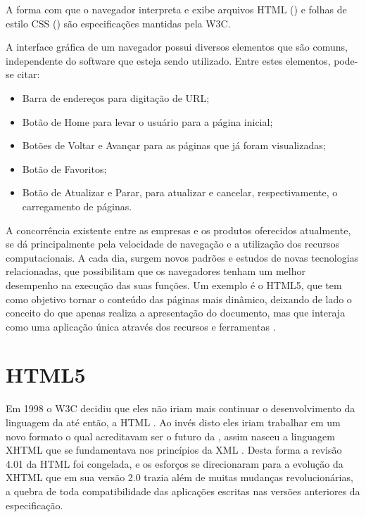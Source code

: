 \documentclass[espaco=simples,appendix=Name]{abnt}
\begin{document}
A forma com que o navegador interpreta e exibe arquivos HTML () e folhas de estilo CSS () são especificações mantidas pela W3C.

A interface gráfica de um navegador possui diversos elementos que são comuns, independente do software que esteja sendo utilizado. Entre estes elementos, pode-se citar: 
\begin{itemize}
	\item Barra de endereços para digitação de URL;
	\item Botão de Home para levar o usuário para a página inicial;
	\item Botões de Voltar e Avançar para as páginas que já foram visualizadas;
	\item Botão de Favoritos;
	\item Botão de Atualizar e Parar, para atualizar e cancelar, respectivamente, o carregamento de páginas.
\end{itemize}

A concorrência existente entre as empresas e os produtos oferecidos atualmente, se dá principalmente pela velocidade de navegação e a utilização dos recursos computacionais. A cada dia, surgem novos padrões e estudos de novas tecnologias relacionadas, que possibilitam que os navegadores tenham um melhor desempenho na execução das suas funções. Um exemplo é o HTML5, que tem como objetivo tornar o conteúdo das páginas mais dinâmico, deixando de lado o conceito do  que apenas realiza a apresentação do documento, mas que interaja como uma aplicação única através dos recursos e ferramentas \cite{WebAppPlataform}.

\section{HTML5}

Em 1998 o W3C decidiu que eles não iriam mais continuar o desenvolvimento da linguagem da  até então, a HTML . Ao invés disto eles iriam trabalhar em um novo formato o qual acreditavam ser o futuro da , assim nasceu a linguagem XHTML  que se fundamentava nos princípios da XML . Desta forma a revisão 4.01 da HTML foi congelada, e os esforços se direcionaram para a evolução da XHTML que em sua versão 2.0 trazia além de muitas mudanças revolucionárias, a quebra de toda compatibilidade das aplicações escritas nas versões anteriores da especificação.
\end{document}
